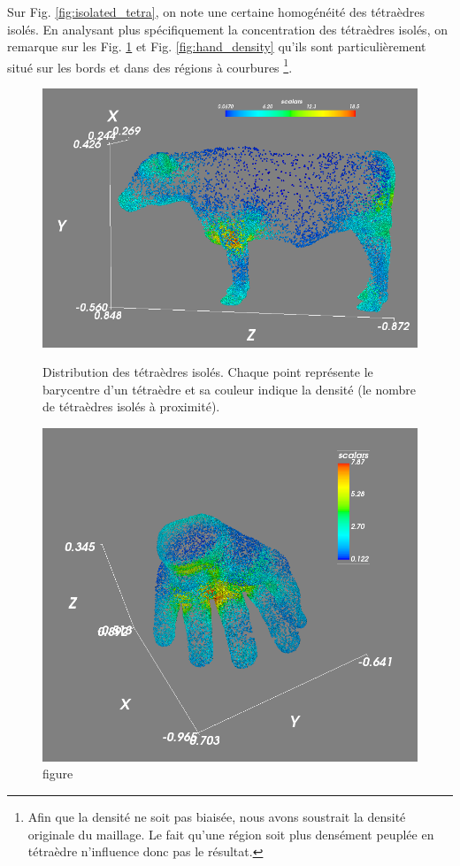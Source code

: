 \documentclass[a4paper,11pt,openany]{article}
\begin{document}
\noindent
Sur Fig. \ref{fig:isolated_tetra}, on note une certaine homogénéité des tétraèdres isolés. En analysant plus spécifiquement la concentration des tétraèdres isolés, on remarque sur les Fig. \ref{fig:density_cow} et Fig. \ref{fig:hand_density} qu'ils sont particulièrement situé sur les bords et dans des régions à courbures \footnote{Afin que la densité ne soit pas biaisée, nous avons soustrait la densité originale du maillage. Le fait qu'une région soit plus densément peuplée en tétraèdre n'influence donc pas le résultat.}.
\begin{figure}[H]
\centering
\begin{minipage}{.5\textwidth}
  \centering
  \includegraphics[scale=0.3]{Images/density_cow}
  \caption{figure}{Distribution des tétraèdres isolés. Chaque point représente le barycentre d'un tétraèdre et sa couleur indique la densité (le nombre de tétraèdres isolés à proximité).}
  \label{fig:density_cow}
\end{minipage}%
\begin{minipage}{.5\textwidth}
  \centering
  \includegraphics[scale=0.23]{Images/hand_density}

\end{minipage}
\end{figure}
\end{document}
